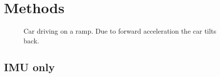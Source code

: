 \chapter{Methods}
\label{ch:Methods}

\begin{figure}[htpb]
    \centering
	
	\caption{Car driving on a ramp. Due to forward acceleration the car tilts back.}
	\label{fig:tikz_car_tilt}
\end{figure}


\section{IMU only}
